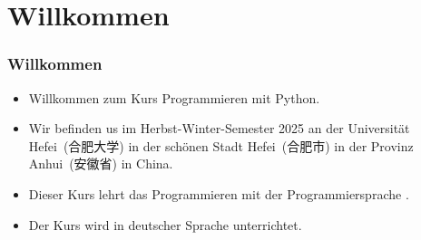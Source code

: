 \documentclass[aspectratio=169,mathserif,notheorems]{beamer}%
\subtitle{1.~Organisation}%
\begin{document}
%
%
\startPresentation%
%
\section{Willkommen}%
%
\begin{frame}[t]%
\frametitle{Willkommen}%
\begin{itemize}%
%
\item Willkommen zum Kurs \alert{Programmieren mit Python}.%
%
\item<2-> Wir befinden us im Herbst-Winter-Semester 2025 an der Universität Hefei~(合肥大学) in der schönen Stadt Hefei~(合肥市) in der Provinz Anhui~(安徽省) in China.%
%
\item<3-> Dieser Kurs lehrt das Programmieren mit der Programmiersprache \python.%
%
\item<4-> Der Kurs wird in deutscher Sprache unterrichtet.%
%
\end{itemize}%
\end{frame}%
%
\end{document}
